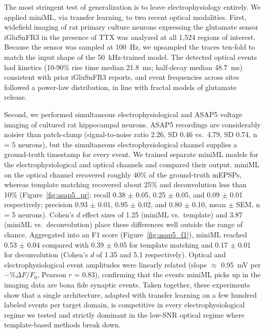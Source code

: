 \documentclass[11pt]{article}
\begin{document}
The most stringent test of generalization is to leave electrophysiology
entirely. We applied miniML, via transfer learning, to two recent optical
modalities. First, widefield imaging of rat primary culture neurons
expressing the glutamate sensor iGluSnFR3 \citep{aggarwal2023iglusnfr3} in
the presence of TTX was analyzed at all 1{,}524 regions of interest. Because
the sensor was sampled at 100~Hz, we upsampled the traces ten-fold to match
the input shape of the 50~kHz-trained model. The detected optical events
had kinetics (10-90\% rise time median 21.8~ms; half-decay median 48.7~ms)
consistent with prior iGluSnFR3 reports, and event frequencies across sites
followed a power-law distribution, in line with fractal models of glutamate
release.

Second, we performed simultaneous electrophysiological and ASAP5 voltage
imaging \citep{hao2024asap5} of cultured rat hippocampal neurons. ASAP5
recordings are considerably noisier than patch-clamp (signal-to-noise
ratio 2.26, SD 0.46 vs.\ 4.79, SD 0.74, n = 5 neurons), but the simultaneous
electrophysiological channel supplies a ground-truth timestamp for every
event. We trained separate miniML models for the electrophysiological and
optical channels and compared their output. miniML on the optical channel
recovered roughly 40\% of the ground-truth mEPSPs, whereas template matching
recovered about 25\% and deconvolution less than 10\%
(Figure~\ref{fig:asap5_pr}; recall 0.38 $\pm$ 0.05, 0.25 $\pm$ 0.05, and
0.09 $\pm$ 0.01 respectively; precision 0.93 $\pm$ 0.01, 0.95 $\pm$ 0.02,
and 0.80 $\pm$ 0.10, mean $\pm$ SEM, n = 5 neurons). Cohen's $d$ effect
sizes of 1.25 (miniML vs.\ template) and 3.87 (miniML vs.\ deconvolution)
place these differences well outside the range of chance. Aggregated into an
F1 score (Figure~\ref{fig:asap5_f1}), miniML reached 0.53 $\pm$ 0.04
compared with 0.39 $\pm$ 0.05 for template matching and 0.17 $\pm$ 0.01 for
deconvolution (Cohen's $d$ of 1.35 and 5.1 respectively). Optical and
electrophysiological event amplitudes were linearly related (slope
$\approx$ 0.95~mV per $-\%\Delta F/F_0$, Pearson $r$ = 0.83), confirming
that the events miniML picks up in the imaging data are bona fide synaptic
events. Taken together, these experiments show that a single architecture,
adapted with transfer learning on a few hundred labeled events per target
domain, is competitive in every electrophysiological regime we tested and
strictly dominant in the low-SNR optical regime where template-based
methods break down.
\end{document}
